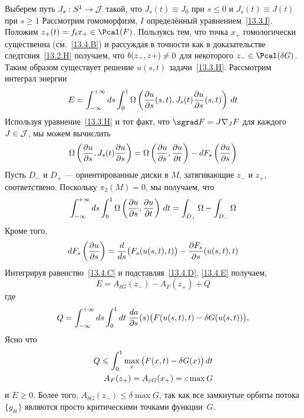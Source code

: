 Выберем путь $J_{s}:S^{1}\to\mathcal{J}$ такой, что $J_{s}(t)\equiv J_{0}$
при $s\le0$ и $J_{s}(t)\equiv J(t)$ при $s\ge1$
Рассмотрим гомоморфизм, $I$ определённый уравнением~\ref{13.3.I}.
Положим $z_{+}(t)=f_{t}x_{+}\in\Pcal(F)$.
Пользуясь тем, что точка $x_{+}$ гомологически существенна
(см.~\ref{13.4.B}) и рассуждая в точности как в доказательстве
следтсвия~\ref{13.2.H} получаем, что $b(z_{-}, z+)\z\neq 0$ для
некоторого $z_{-}\in\Pcal(\delta G)$.
Таким образом существует решение $u(s, t)$ задачи~\ref{13.3.H}.
Рассмотрим интеграл энергии
\[
E=
\int_{-\infty}^{+\infty}d s
\int_{0}^{1}
\Omega\left(\frac{\partial u}{\partial s}(s,t),
J_{s}(t)\frac{\partial u}{\partial s}(s,t)\right)
\,d t
\]
Используя уравнение~\ref{13.3.H} и тот факт, что
$\sgrad F=J\nabla_{J}F$ для каждого $J\in\mathcal{J}$, мы можем вычислить
\begin{equation}\label{13.4.C}
  \Omega\left(\frac{\partial u}{\partial s},
  J_{s}(t)\frac{\partial u}{\partial s}\right)
  =
  \Omega\left(\frac{\partial u}{\partial s},
         \frac{\partial u}{\partial t}\right)
  -
  d F_{s}\left(\frac{\partial u}{\partial s}\right)
\end{equation}
Пусть $D_{-}$ и $D_{+}$ — ориентированные диски в $M$,
затягивающие $z_{-}$ и
$z_{+}$, соответствено.  Поскольку $π_{2}(M)=0$, мы получаем, что
\begin{equation}\label{13.4.D}
  \int_{-\infty}^{+\infty}d s
  \int_{0}^{1}
  \Omega\left(\frac{\partial u}{\partial s},
  \frac{\partial u}{\partial t}\right)
  \,d t
  =
  \int_{D_{+}}\Omega-\int_{D_{-}}\Omega
\end{equation}
Кроме того,
\begin{equation}\label{13.4.E}
  d F_{s}\left(\frac{\partial u}{\partial s}\right)
  =
  \frac{d}{d s}\big(F_{s}(u(s,t),t)\big) -
  \frac{\partial F_{s}}{\partial s}(u(s,t),t)  
\end{equation}
Интегрируя равенство~\ref{13.4.C} и подставляя~\ref{13.4.D}, \ref{13.4.E}
получаем,
\[
E=A_{\delta G}(z_{-})-A_{F}(z_{+})+Q
\]
где
\[
Q=\int_{-\infty}^{+\infty}d s
  \int_{0}^{1}d t\;
  \frac{d a}{\partial s}(s)\big(F(u(s,t),t)-\delta G(u(s,t))\big),
\]
Ясно что
\begin{align*}
  Q\leqslant
  \int_{0}^{1} \max_{x}\big(F(x,t)-\delta G(x)\big)\,d t\\
  A_{F}(z_{+})=A_{\varepsilon G}(x_{+})=\varepsilon\max G
\end{align*}
и $E\ge0$.
Более того, $A_{\delta G}(z_{-})\le \delta\max G$, так как все
замкнутые орбиты потока $\{g_{\delta t}\}$ являются просто
критическими точками функции~$G$.

